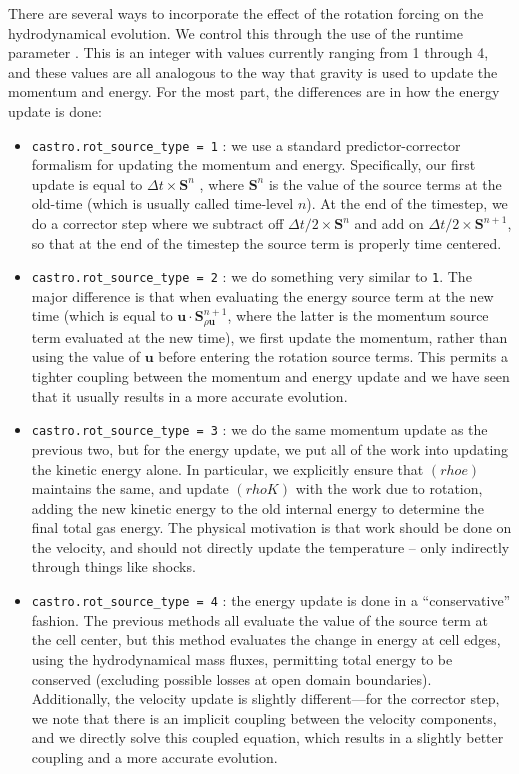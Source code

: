 There are several ways to incorporate the effect of the rotation
forcing on the hydrodynamical evolution. We control this through the
use of the runtime parameter . This
is an integer with values currently ranging from 1 through 4, and
these values are all analogous to the way that gravity is used to
update the momentum and energy. For the most part, the differences are
in how the energy update is done:
\begin{itemize}

\item {\tt castro.rot\_source\_type = 1} : we use a
  standard predictor-corrector formalism for updating the momentum and
  energy. Specifically, our first update is equal to $\Delta t \times
  \mathbf{S}^n$ , where $\mathbf{S}^n$ is the value of the source
  terms at the old-time (which is usually called time-level $n$).  At
  the end of the timestep, we do a corrector step where we subtract
  off $\Delta t / 2 \times \mathbf{S}^n$ and add on $\Delta t / 2
  \times \mathbf{S}^{n+1}$, so that at the end of the timestep the
  source term is properly time centered.

\item {\tt castro.rot\_source\_type = 2} : we do something very
  similar to {\tt 1}. The major difference is that when evaluating the
  energy source term at the new time (which is equal to $\mathbf{u}
  \cdot \mathbf{S}^{n+1}_{\rho \mathbf{u}}$, where the latter is the
  momentum source term evaluated at the new time), we first update the
  momentum, rather than using the value of $\mathbf{u}$ before
  entering the rotation source terms. This permits a tighter coupling
  between the momentum and energy update and we have seen that it
  usually results in a more accurate evolution.

\item {\tt castro.rot\_source\_type = 3} : we do the same momentum
  update as the previous two, but for the energy update, we put all of
  the work into updating the kinetic energy alone. In particular, we
  explicitly ensure that $(rho e)$ maintains the same, and update
  $(rho K)$ with the work due to rotation, adding the new kinetic
  energy to the old internal energy to determine the final total gas
  energy.  The physical motivation is that work should be done on the
  velocity, and should not directly update the temperature -- only
  indirectly through things like shocks.

\item {\tt castro.rot\_source\_type = 4} : the energy update is done
  in a ``conservative'' fashion.  The previous methods all evaluate
  the value of the source term at the cell center, but this method
  evaluates the change in energy at cell edges, using the
  hydrodynamical mass fluxes, permitting total energy to be conserved
  (excluding possible losses at open domain boundaries). Additionally,
  the velocity update is slightly different---for the corrector step,
  we note that there is an implicit coupling between the velocity
  components, and we directly solve this coupled equation, which
  results in a slightly better coupling and a more accurate evolution.
\end{itemize}

